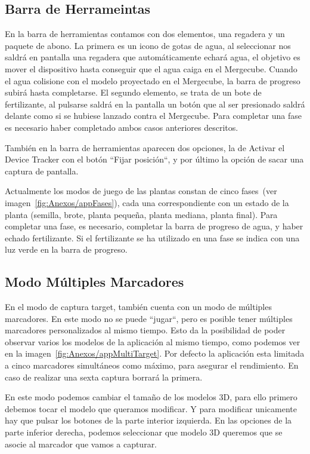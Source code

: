 
\subsection{Barra de Herrameintas}
En la barra de herramientas contamos con dos elementos, una regadera y un paquete de abono. La primera es un icono de gotas de agua, al seleccionar nos saldrá en pantalla una regadera que automáticamente echará agua, el objetivo es mover el dispositivo hasta conseguir que el agua caiga en el Mergecube. Cuando el agua colisione con el modelo proyectado en el Mergecube, la barra de progreso subirá hasta completarse. 
El segundo elemento, se trata de un bote de fertilizante, al pulsarse saldrá en la pantalla un botón que al ser presionado saldrá delante como si se hubiese lanzado contra el Mergecube.
Para completar una fase es necesario haber completado ambos casos anteriores descritos.

También en la barra de herramientas aparecen dos opciones, la de Activar el Device Tracker con el botón ``Fijar posición``, y por último la opción de sacar una captura de pantalla.


Actualmente los modos de juego de las plantas constan de cinco fases~(ver imagen~\ref{fig:Anexos/appFases}), cada una correspondiente con un estado de la planta (semilla, brote, planta pequeña, planta mediana, planta final). Para completar una fase, es necesario, completar la barra de progreso de agua, y haber echado fertilizante. Si el fertilizante se ha utilizado en una fase se indica con una luz verde en la barra de progreso.


\subsection{Modo Múltiples Marcadores}
En el modo de captura target, también cuenta con un modo de múltiples marcadores. En este modo no se puede ``jugar``, pero es posible tener múltiples marcadores personalizados al mismo tiempo. Esto da la posibilidad de poder observar varios los modelos de la aplicación al mismo tiempo, como podemos ver en la imagen~\ref{fig:Anexos/appMultiTarget}. Por defecto la aplicación esta limitada a cinco marcadores simultáneos como máximo, para asegurar el rendimiento. En caso de realizar una sexta captura borrará la primera.


En este modo podemos cambiar el tamaño de los modelos 3D, para ello primero debemos tocar el modelo que queramos modificar. Y para modificar unicamente hay que pulsar los botones de la parte interior izquierda.
En las opciones de la parte inferior derecha, podemos seleccionar que modelo 3D queremos que se asocie al marcador que vamos a capturar.


 

